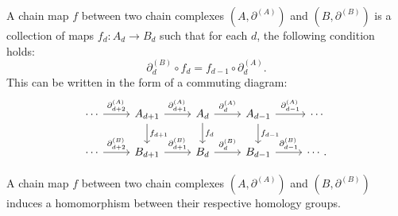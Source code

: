 \begin{definition}
	A chain map $f$ between two chain complexes $(A, \partial^{(A)})$ and $(B,\partial
	^{(B)})$ is a collection of maps $f_{d}: A_{d} \rightarrow B_{d}$ such that for
	each $d$, the following condition holds:
	\begin{equation}
		\partial^{(B)}_{d}\circ f_{d} = f_{d-1}\circ \partial^{(A)}_{d}.
	\end{equation}
	This can be written in the form of a commuting diagram:
	\begin{equation}
		\begin{tikzcd}
			\cdots \arrow[r, "\partial^{(A)}_{d+2}"] & A_{d+1} \arrow[r, "\partial^{(A)}_{d+1}"]
			\arrow[d, "f_{d+1}"] & A_d \arrow[r, "\partial^{(A)}_{d}"] \arrow[d, "f_d"]
			& A_{d-1} \arrow[r, "\partial^{(A)}_{d-1}"] \arrow[d, "f_{d-1}"] & \cdots \\
			\cdots \arrow[r, "\partial^{(B)}_{d+2}"] & B_{d+1} \arrow[r, "\partial^{(B)}_{d+1}"]
			& B_d \arrow[r, "\partial^{(B)}_d"] & B_{d-1} \arrow[r, "\partial^{(B)}_{d-1}"]
			& \cdots.
		\end{tikzcd}
	\end{equation}
\end{definition}

\begin{theorem}{\cite[Theorem 1.3.1]{Weibel1994}}
	\label{chainmaps}
	A chain map $f$ between two chain complexes $(A, \partial^{(A)}
	)$ and $(B, \partial^{(B)})$ induces a homomorphism between their respective homology
	groups.
\end{theorem}

